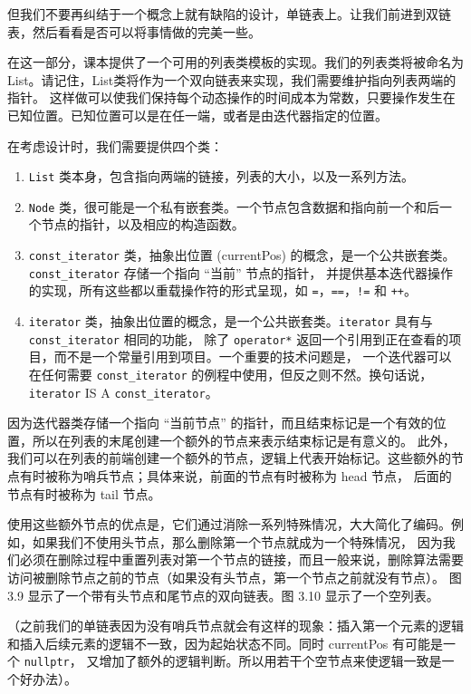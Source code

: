 \documentclass[a4paper]{ctexart}
\theoremstyle{definition}
\theoremstyle{definition}
\begin{document}
但我们不要再纠结于一个概念上就有缺陷的设计，单链表上。让我们前进到双链表，然后看看是否可以将事情做的完美一些。

在这一部分，课本提供了一个可用的列表类模板的实现。我们的列表类将被命名为 List。请记住，List类将作为一个双向链表来实现，我们需要维护指向列表两端的指针。
这样做可以使我们保持每个动态操作的时间成本为常数，只要操作发生在已知位置。已知位置可以是在任一端，或者是由迭代器指定的位置。

在考虑设计时，我们需要提供四个类：
\begin{enumerate}
  \item \verb|List| 类本身，包含指向两端的链接，列表的大小，以及一系列方法。
  \item \verb|Node| 类，很可能是一个私有嵌套类。一个节点包含数据和指向前一个和后一个节点的指针，以及相应的构造函数。
  \item \verb|const_iterator| 类，抽象出位置 (currentPos) 的概念，是一个公共嵌套类。\verb|const_iterator| 存储一个指向 ``当前'' 节点的指针，
  并提供基本迭代器操作的实现，所有这些都以重载操作符的形式呈现，如 \verb|=|，\verb|==|，\verb|!=| 和 \verb|++|。
  \item \verb|iterator| 类，抽象出位置的概念，是一个公共嵌套类。\verb|iterator| 具有与 \verb|const_iterator| 相同的功能，
  除了 \verb|operator*| 返回一个引用到正在查看的项目，而不是一个常量引用到项目。一个重要的技术问题是，
  一个迭代器可以在任何需要 \verb|const_iterator| 的例程中使用，但反之则不然。换句话说，\verb|iterator| IS A \verb|const_iterator|。
\end{enumerate}

因为迭代器类存储一个指向 ``当前节点'' 的指针，而且结束标记是一个有效的位置，所以在列表的末尾创建一个额外的节点来表示结束标记是有意义的。
此外，我们可以在列表的前端创建一个额外的节点，逻辑上代表开始标记。这些额外的节点有时被称为哨兵节点；具体来说，前面的节点有时被称为 head 节点，
后面的节点有时被称为 tail 节点。

使用这些额外节点的优点是，它们通过消除一系列特殊情况，大大简化了编码。例如，如果我们不使用头节点，那么删除第一个节点就成为一个特殊情况，
因为我们必须在删除过程中重置列表对第一个节点的链接，而且一般来说，删除算法需要访问被删除节点之前的节点（如果没有头节点，第一个节点之前就没有节点）。
图 3.9 显示了一个带有头节点和尾节点的双向链表。图 3.10 显示了一个空列表。
  
（之前我们的单链表因为没有哨兵节点就会有这样的现象：插入第一个元素的逻辑和插入后续元素的逻辑不一致，因为起始状态不同。同时 currentPos 有可能是一个 \verb|nullptr|，
又增加了额外的逻辑判断。所以用若干个空节点来使逻辑一致是一个好办法）。
\end{document}

